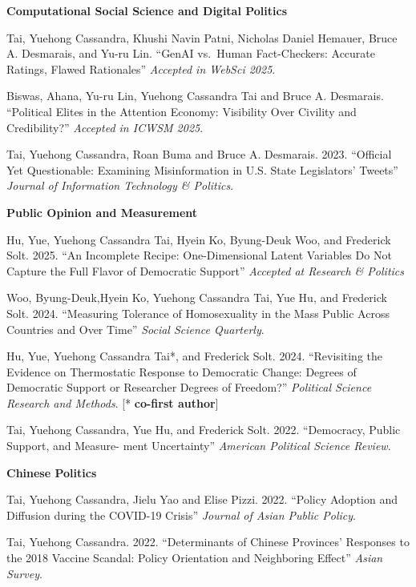 \documentclass[10.5pt,]{article}
\providecommand{\tightlist}{%
	\setlength{\itemsep}{0pt}\setlength{\parskip}{0pt}}
\renewenvironment{itemize}{
	\begin{list}{}{
			\setlength{\leftmargin}{1.5em}
		}
	}{
	\end{list}
}
\begin{document}
\begin{itemize}
\tightlist
\item
  \textbf{Computational Social Science and Digital Politics}

  \begin{itemize}
  \item
    Tai, Yuehong Cassandra, Khushi Navin Patni, Nicholas Daniel Hemauer,
    Bruce A. Desmarais, and Yu-ru Lin. ``GenAI vs.~Human Fact-Checkers:
    Accurate Ratings, Flawed Rationales'' \emph{Accepted in WebSci
    2025}.
  \item
    Biswas, Ahana, Yu-ru Lin, Yuehong Cassandra Tai and Bruce A.
    Desmarais. ``Political Elites in the Attention Economy: Visibility
    Over Civility and Credibility?'' \emph{Accepted in ICWSM 2025}.
  \item
    Tai, Yuehong Cassandra, Roan Buma and Bruce A. Desmarais. 2023.
    ``Oﬀicial Yet Questionable: Examining Misinformation in U.S. State
    Legislators' Tweets'' \emph{Journal of Information Technology \&
    Politics}.
  \end{itemize}
\item
  \textbf{Public Opinion and Measurement}

  \begin{itemize}
  \tightlist
  \item
    Hu, Yue, Yuehong Cassandra Tai, Hyein Ko, Byung-Deuk Woo, and
    Frederick Solt. 2025. ``An Incomplete Recipe: One-Dimensional Latent
    Variables Do Not Capture the Full Flavor of Democratic Support''
    \emph{Accepted at Research \& Politics}
  \item
    Woo, Byung-Deuk,Hyein Ko, Yuehong Cassandra Tai, Yue Hu, and
    Frederick Solt. 2024. ``Measuring Tolerance of Homosexuality in the
    Mass Public Across Countries and Over Time'' \emph{Social Science
    Quarterly}.
  \item
    Hu, Yue, Yuehong Cassandra Tai*, and Frederick Solt. 2024.
    ``Revisiting the Evidence on Thermostatic Response to Democratic
    Change: Degrees of Democratic Support or Researcher Degrees of
    Freedom?'' \emph{Political Science Research and Methods}. {[}*
    \textbf{co-first author}{]}
  \item
    Tai, Yuehong Cassandra, Yue Hu, and Frederick Solt. 2022.
    ``Democracy, Public Support, and Measure- ment Uncertainty''
    \emph{American Political Science Review}.
  \end{itemize}
\item
  \textbf{Chinese Politics}

  \begin{itemize}
  \tightlist
  \item
    Tai, Yuehong Cassandra, Jielu Yao and Elise Pizzi. 2022. ``Policy
    Adoption and Diffusion during the COVID-19 Crisis'' \emph{Journal of
    Asian Public Policy}.
  \item
    Tai, Yuehong Cassandra. 2022. ``Determinants of Chinese Provinces'
    Responses to the 2018 Vaccine Scandal: Policy Orientation and
    Neighboring Effect'' \emph{Asian Survey}.
  \end{itemize}
\end{itemize}
\end{document}
